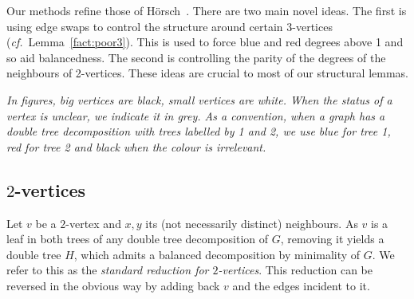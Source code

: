 \documentclass[11pt, reqno, a4paper]{article}
\theoremstyle{definition}
\numberwithin{equation}{section}
\begin{document}
Our methods refine those of H\"{o}rsch~\cite{horsch2021globally}. 
There are two main novel ideas. The first is using edge swaps to control the structure around certain 3-vertices (\emph{cf.}~Lemma~\ref{fact:poor3}). This is used to force blue and red degrees above 1 and so aid balancedness.
The second is controlling the parity of the degrees of the neighbours of 2-vertices.
These ideas are crucial to most of our structural lemmas.

\textit{In figures, big vertices are black, small vertices are white. 
When the status of a vertex is unclear, we indicate it in grey.
As a convention, when a graph has a double tree decomposition with trees labelled by 1 and 2, we use blue for tree 1, red for tree 2 and black when the colour is irrelevant.}

\subsection{\texorpdfstring{$2$}{2}-vertices}\label{subsec:2verts}
Let $v$ be a $2$-vertex and $x,y$ its (not necessarily distinct) neighbours. 
As $v$ is a leaf in both trees of any double tree decomposition of $G$, removing it yields a double tree $H$, which admits a balanced decomposition by minimality of $G$.
We refer to this as the \emph{standard reduction for $2$-vertices}.
This reduction can be reversed in the obvious way by adding back $v$ and the edges incident to it.
\end{document}
